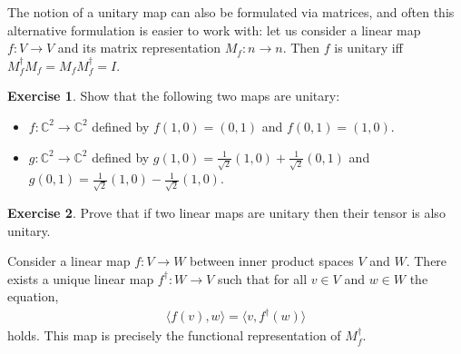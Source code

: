 \documentclass[a4paper, 11pt]{article}
\newcommand{\complex}{\mathbb{C}}
\theoremstyle{definition}
\newtheorem{exercise}{Exercise}
\begin{document}
The notion of a unitary map can also be formulated via matrices, and
often this alternative formulation is easier to work with: let us
consider a linear map $f : V \to V$ and its matrix representation
$M_f : n \to n$. Then $f$ is unitary iff
$M_f^\dagger M_f = M_f M_f^\dagger = I$.
\begin{exercise}
  Show that the following two maps are unitary:
  \begin{itemize}
  \item $f : \complex^2 \to \complex^2$ defined by $f(1,0) = (0,1)$ and
    $f(0,1) = (1,0)$.
  \item $g : \complex^2 \to \complex^2$ defined by
  $g(1,0) = \frac{1}{\sqrt{2}}(1,0) + \frac{1}{\sqrt{2}}(0,1)$ and
  $g(0,1) = \frac{1}{\sqrt{2}}(1,0) - \frac{1}{\sqrt{2}}(1,0)$.
  \end{itemize}
\end{exercise}

\begin{exercise}
  Prove that if two linear maps are unitary then their tensor is also
  unitary.
\end{exercise}

Consider a linear map $f : V \to W$ between inner product spaces $V$
and $W$. There exists a unique linear map $f^\dagger : W \to V$ such
that for all $v \in V$ and $w \in W$ the equation,
\begin{align*}
  \langle f (v), w \rangle = \langle v, f^\dagger (w) \rangle
\end{align*}
holds. This map is precisely the functional representation of
$M_f^\dagger$.



\end{document}
